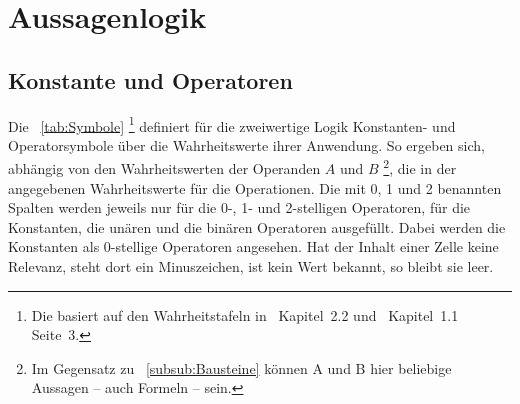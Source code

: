 \section{Aussagenlogik}%
\label{sec:Aussagenlogik}

\subsection{Konstante und Operatoren}%
\label{sub:Operatoren}

Die \tablename~\vref{tab:Symbole}
\footnote{%
	Die \tablename{} basiert auf den Wahrheitstafeln in~\cite{bib:Junktor} Kapitel~2.2 und~\cite{bib:Rautenberg} Kapitel~1.1 Seite~3.%
}
definiert für die zweiwertige Logik Konstanten- und Operatorsymbole über die Wahrheitswerte ihrer Anwendung.
So ergeben sich, abhängig von den Wahrheitswerten der Operanden $A$ und $B$
\footnote{%
	Im Gegensatz zu \subsubsectionname~\vref{subsub:Bausteine} können A und B hier beliebige Aussagen -- auch Formeln -- sein.%
},
die in der \tablename{} angegebenen Wahrheitswerte für die Operationen.
Die mit 0, 1 und 2 benannten Spalten werden jeweils nur für die 0-, 1- und 2-stelligen Operatoren, \textdh für die Konstanten, die unären und die binären Operatoren ausgefüllt.
Dabei werden die Konstanten als 0-stellige Operatoren angesehen.
Hat der Inhalt einer Zelle keine Relevanz, steht dort ein Minuszeichen, ist kein Wert bekannt, so bleibt sie leer.

                                        
 \setcounter{pnequiv} {\value{prio}}
  \setcounter{pequiv}  {\value{prio}} 
   \setcounter{pnrep}   {\value{prio}}
    \setcounter{prep}    {\value{prio}}
   \setcounter{pnimp}   {\value{prio}}
    \setcounter{pimp}    {\value{prio}} 
    \setcounter{padd}    {\value{prio}}
    \setcounter{pxor}    {\value{prio}}
    \setcounter{pnor}    {\value{prio}}
     \setcounter{por}     {\value{prio}} 
   \setcounter{pmult}   {\value{prio}}
   \setcounter{pnand}   {\value{prio}}
    \setcounter{pand}    {\value{prio}} 
    \setcounter{pnot}    {\value{prio}}

